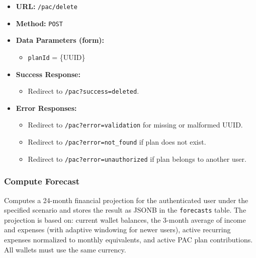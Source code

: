 \begin{itemize}
    \item \textbf{URL:} \texttt{/pac/delete}
    \item \textbf{Method:} \texttt{POST}
    \item \textbf{Data Parameters (form):}
    \begin{itemize}
        \item \texttt{planId} = \{UUID\}
    \end{itemize}
    \item \textbf{Success Response:}
    \begin{itemize}
        \item Redirect to \texttt{/pac?success=deleted}.
    \end{itemize}
    \item \textbf{Error Responses:}
    \begin{itemize}
        \item Redirect to \texttt{/pac?error=validation} for missing or malformed UUID.
        \item Redirect to \texttt{/pac?error=not\_found} if plan does not exist.
        \item Redirect to \texttt{/pac?error=unauthorized} if plan belongs to another user.
    \end{itemize}
\end{itemize}


\subsubsection{Compute Forecast}

Computes a 24-month financial projection for the authenticated user under the specified scenario and stores the result as JSONB in the \texttt{forecasts} table. The projection is based on: current wallet balances, the 3-month average of income and expenses (with adaptive windowing for newer users), active recurring expenses normalized to monthly equivalents, and active PAC plan contributions. All wallets must use the same currency.

